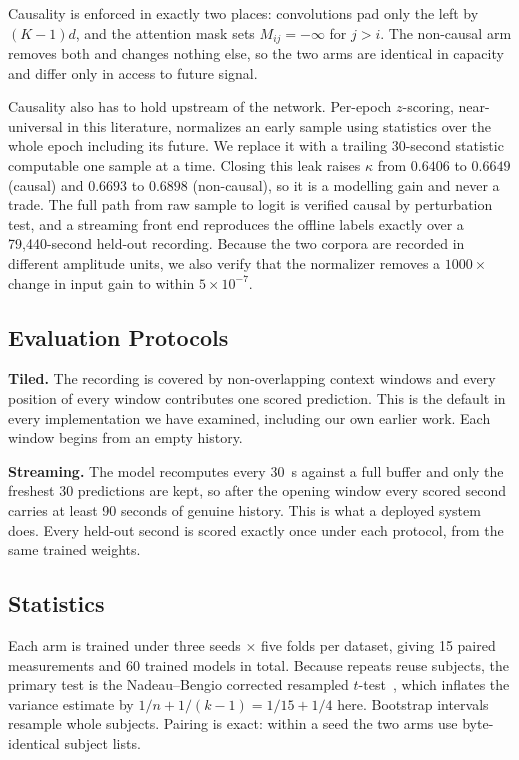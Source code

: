 \documentclass[conference]{IEEEtran}
\begin{document}
Causality is enforced in exactly two places: convolutions pad only the left by $(K-1)d$, and the
attention mask sets $M_{ij} = -\infty$ for $j > i$. The non-causal arm removes both and changes
nothing else, so the two arms are identical in capacity and differ only in access to future
signal.

Causality also has to hold upstream of the network. Per-epoch $z$-scoring, near-universal in this
literature, normalizes an early sample using statistics over the whole epoch including its future.
We replace it with a trailing 30-second statistic computable one sample at a time. Closing this
leak raises $\kappa$ from $0.6406$ to $0.6649$ (causal) and $0.6693$ to $0.6898$ (non-causal), so
it is a modelling gain and never a trade. The full path from raw sample to logit is verified
causal by perturbation test, and a streaming front end reproduces the offline labels exactly over
a 79{,}440-second held-out recording. Because the two corpora are recorded in different amplitude
units, we also verify that the normalizer removes a $1000\times$ change in input gain to within
$5\times10^{-7}$.

\subsection{Evaluation Protocols}
\label{sec:protocol}

\textbf{Tiled.} The recording is covered by non-overlapping context windows and every position of
every window contributes one scored prediction. This is the default in every implementation we
have examined, including our own earlier work. Each window begins from an empty history.

\textbf{Streaming.} The model recomputes every 30~s against a full buffer and only the freshest 30
predictions are kept, so after the opening window every scored second carries at least 90 seconds
of genuine history. This is what a deployed system does. Every held-out second is scored exactly
once under each protocol, from the same trained weights.

\subsection{Statistics}

Each arm is trained under three seeds $\times$ five folds per dataset, giving 15 paired
measurements and 60 trained models in total. Because repeats reuse subjects, the primary test is
the Nadeau--Bengio corrected resampled $t$-test~\cite{nadeau}, which inflates the variance
estimate by $1/n + 1/(k-1) = 1/15 + 1/4$ here.
Bootstrap intervals resample whole subjects. Pairing is exact: within a seed the two arms use
byte-identical subject lists.
\end{document}
